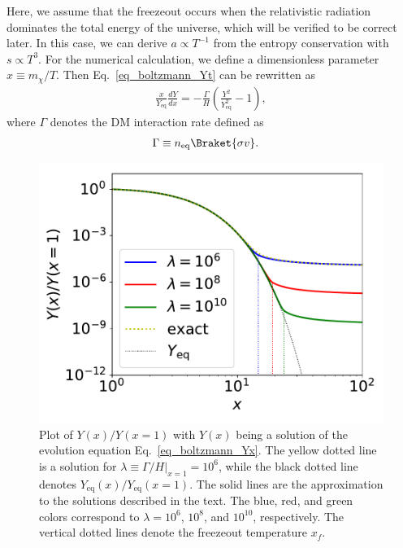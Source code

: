 \documentclass[12pt,twoside,book]{article}
\begin{document}
Here, we assume that the freezeout occurs when the relativistic radiation dominates the total energy of the universe, which will be verified to be correct later.
In this case, we can derive $a \propto T^{-1}$ from the entropy conservation with $s \propto T^3$.
For the numerical calculation, we define a dimensionless parameter $x \equiv m_\chi / T$.
Then Eq.~\eqref{eq_boltzmann_Yt} can be rewritten as
\begin{align}
  \frac{x}{Y_{\mathrm{eq}}} \frac{d Y}{d x} =
  -\frac{\Gamma}{H} \left( \frac{Y^2}{Y_{\mathrm{eq}}^2} - 1 \right),\label{eq_boltzmann_Yx}
\end{align}
where $\Gamma$ denotes the DM interaction rate defined as
\begin{align}
  \Gamma &\equiv n_{\mathrm{eq}} \Braket{\sigma v}.\label{eq_lambda}
\end{align}

\begin{figure}[t]
  \centering
  \includegraphics[width=0.5\hsize]{DMrelic.pdf}
  \caption{
    Plot of $Y(x) / Y(x=1)$ with $Y(x)$ being a solution of the evolution equation Eq.~\eqref{eq_boltzmann_Yx}.
    The yellow dotted line is a solution for $\lambda \equiv \left. \Gamma / H \right|_{x=1} = 10^6$, while the black dotted line denotes $Y_{\mathrm{eq}} (x) / Y_{\mathrm{eq}} (x=1)$.
    The solid lines are the approximation to the solutions described in the text.
    The blue, red, and green colors correspond to $\lambda = 10^6$, $10^8$, and $10^{10}$, respectively.
    The vertical dotted lines denote the freezeout temperature $x_f$.
  }
  \label{fig_DM_relic}
\end{figure}
\end{document}
